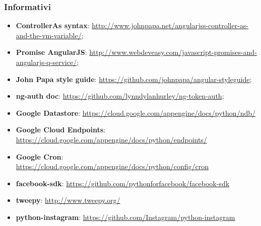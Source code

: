 		\subsubsection{Informativi} %
		\label{ssub:informativi}
			\begin{itemize}
				\item \textbf{ControllerAs syntax}: \url{http://www.johnpapa.net/angularjss-controller-as-and-the-vm-variable/};
				\item \textbf{Promise AngularJS}: \url{http://www.webdeveasy.com/javascript-promises-and-angularjs-q-service/};
				\item \textbf{John Papa style guide}: \url{https://github.com/johnpapa/angular-styleguide};
				\item \textbf{ng-auth doc}: \url{https://github.com/lynndylanhurley/ng-token-auth};
				\item \textbf{Google Datastore}: \url{https://cloud.google.com/appengine/docs/python/ndb/}
				\item \textbf{Google Cloud Endpoints}: \url{https://cloud.google.com/appengine/docs/python/endpoints/}
				\item \textbf{Google Cron}: \url{https://cloud.google.com/appengine/docs/python/config/cron}
				\item \textbf{facebook-sdk}: \url{https://github.com/pythonforfacebook/facebook-sdk}
				\item \textbf{tweepy}: \url{http://www.tweepy.org/}
				\item \textbf{python-instagram}: \url{https://github.com/Instagram/python-instagram}
			\end{itemize}
